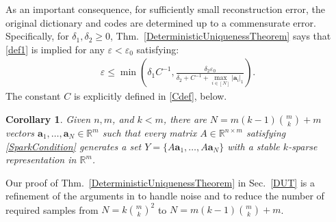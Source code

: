 \documentclass[journal, twocolumn]{IEEEtran}
\newtheorem{corollary}{Corollary}
\newtheorem{remark}{Remark}
\begin{document}



As an important consequence, for sufficiently small reconstruction error, the original dictionary and codes are determined up to a commensurate error. Specifically, for $\delta_1, \delta_2 \geq 0$, Thm.~\ref{DeterministicUniquenessTheorem} says that \eqref{def1} is implied for any $\varepsilon < \varepsilon_0$ satisfying:
\begin{align*}
\varepsilon \leq \min \left( \delta_1 C^{-1}, \frac{ \delta_2 \varepsilon_0}{\delta_2 + C^{-1} + \max_{i \in [N]} |\mathbf{a}_i|_1} \right).
\end{align*}
The constant $C$ is explicitly defined in \eqref{Cdef}, below. 

\begin{corollary}\label{DeterministicUniquenessCorollary}
Given $n, m$, and $k < m$, there are $N =  m(k-1){m \choose k}+m$ vectors \mbox{$\mathbf{a}_1, \ldots, \mathbf{a}_N \in \mathbb{R}^m$} such that every matrix $A \in \mathbb{R}^{n \times m}$ satisfying \eqref{SparkCondition} generates a set $Y = \{A\mathbf{a}_1, \ldots, A\mathbf{a}_N\}$ with a stable $k$-sparse representation in $\mathbb R^m$.
\end{corollary}

Our proof of Thm.~\ref{DeterministicUniquenessTheorem} in Sec.~\ref{DUT} is a refinement of the arguments in \cite{Hillar15} to handle noise and to reduce the number of required samples from $N=k{m \choose k}^2$ to $N = m(k-1){m \choose k}+m$. 
\end{document}
